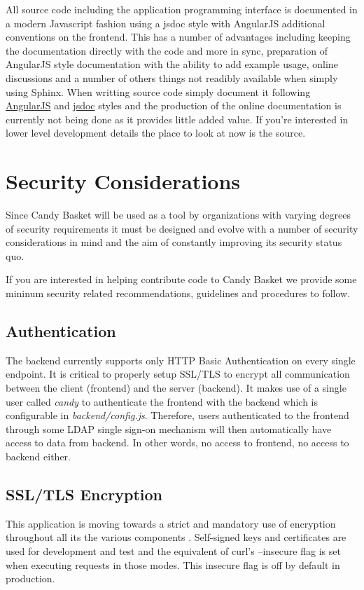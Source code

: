 \documentclass[letterpaper,10pt,english]{sphinxmanual}
\begin{document}
All source code including the application programming interface is
documented in a modern Javascript fashion using a jsdoc style with
AngularJS additional conventions on the frontend. This has a number of
advantages including keeping the documentation directly with the code
and more in sync, preparation of AngularJS style documentation with
the ability to add example usage, online discussions and a number of
others things not readibly available when simply using Sphinx. When
writting source code simply document it following \href{https://github.com/angular/angular.js}{AngularJS} and \href{http://usejsdoc.org/}{jsdoc} styles and the production of the online
documentation is currently not being done as it provides little added
value. If you're interested in lower level development details the
place to look at now is the source.


\section{Security Considerations}
\label{developer-guide:security}\label{developer-guide:security-considerations}
Since Candy Basket will be used as a tool by organizations with
varying degrees of security requirements it must be designed and
evolve with a number of security considerations in mind and the aim of
constantly improving its security status quo.

If you are interested in helping contribute code to Candy Basket we
provide some mininum security related recommendations, guidelines and
procedures to follow.


\subsection{Authentication}
\label{developer-guide:authentication}
The backend currently supports only HTTP Basic Authentication on every
single endpoint. It is critical to properly setup SSL/TLS to encrypt
all communication between the client (frontend) and the server
(backend). It makes use of a single user called \emph{candy} to
authenticate the frontend with the backend which is configurable in
\emph{backend/config.js}. Therefore, users authenticated to the frontend
through some LDAP single sign-on mechanism will then automatically
have access to data from backend. In other words, no access to
frontend, no access to backend either.


\subsection{SSL/TLS Encryption}
\label{developer-guide:ssl-tls-encryption}
This application is moving towards a strict and mandatory use of
encryption throughout all its the various components .  Self-signed
keys and certificates are used for development and test and the
equivalent of curl's --insecure flag is set when executing requests in
those modes. This insecure flag is off by default in production.
\end{document}
